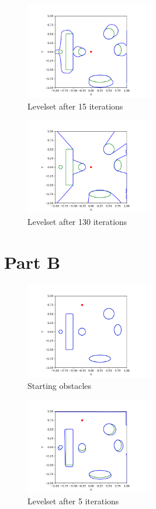 \documentclass{article}
\begin{document}
\begin{figure}[H]
    \caption{Levelset after 15 iterations}
    \centering
        \includegraphics[width=0.5\textwidth]{part_a-levelset-0015.png}
\end{figure}

\begin{figure}[H]
    \caption{Levelset after 130 iterations}
    \centering
        \includegraphics[width=0.5\textwidth]{part_a-levelset-0130.png}
\end{figure}



\newpage
\section*{Part B}
\begin{figure}[H]
    \caption{Starting obstacles}
    \centering
        \includegraphics[width=0.5\textwidth]{part_b-levelset-0000.png}
\end{figure}

\begin{figure}[H]
    \caption{Levelset after 5 iterations}
    \centering
        \includegraphics[width=0.5\textwidth]{part_b-levelset-0005.png}
\end{figure}
\end{document}
